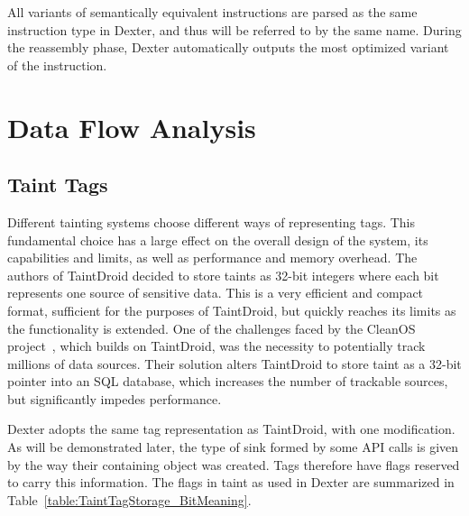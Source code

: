 \documentclass[12pt,twoside,notitlepage]{report}
\begin{document}
All variants of semantically equivalent instructions are parsed as the same instruction type in Dexter, and thus will be referred to by the same name. During the reassembly phase, Dexter automatically outputs the most optimized variant of the instruction.

\section{Data Flow Analysis}
\label{section:DataFlowAnalysis}

\subsection{Taint Tags}
\label{section:Preparation_TaintTags}

Different tainting systems choose different ways of representing tags. This fundamental choice has a large effect on the overall design of the system, its capabilities and limits, as well as performance and memory overhead. The authors of TaintDroid decided to store taints as 32-bit integers where each bit represents one source of sensitive data. This is a very efficient and compact format, sufficient for the purposes of TaintDroid, but quickly reaches its limits as the functionality is extended. One of the challenges faced by the CleanOS project~\cite{Tang:2012:CLM:2387880.2387888}, which builds on TaintDroid, was the necessity to potentially track millions of data sources. Their solution alters TaintDroid to store taint as a 32-bit pointer into an SQL database, which increases the number of trackable sources, but significantly impedes performance. 

Dexter adopts the same tag representation as TaintDroid, with one modification. As will be demonstrated later, the type of sink formed by some API calls is given by the way their containing object was created. Tags therefore have flags reserved to carry this information. The flags in taint as used in Dexter are summarized in Table~\ref{table:TaintTagStorage_BitMeaning}.
\end{document}

